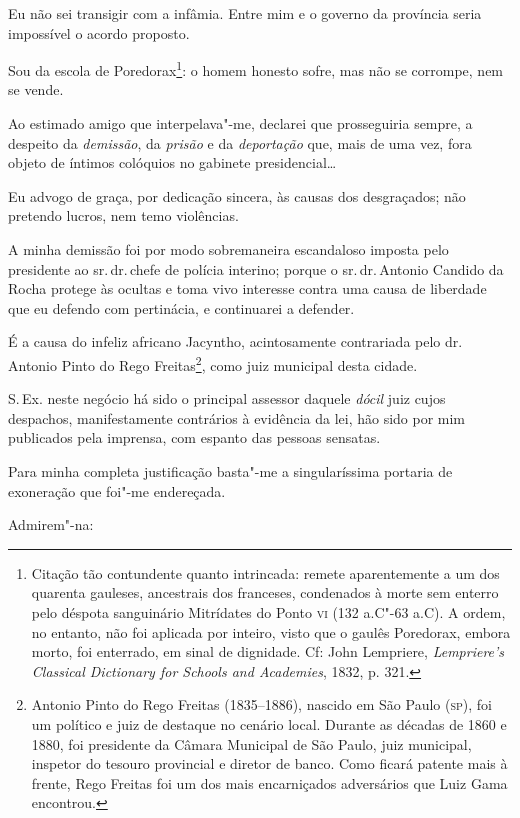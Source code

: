Eu não sei transigir com a infâmia. Entre mim e o governo da província
seria impossível o acordo proposto.

Sou da escola de Poredorax\footnote{Citação tão contundente quanto
  intrincada: remete aparentemente a um dos quarenta gauleses,
  ancestrais dos franceses, condenados à morte sem enterro pelo déspota
  sanguinário Mitrídates do Ponto \textsc{vi} (132 a.C"-63 a.C). A ordem, no
  entanto, não foi aplicada por inteiro, visto que o gaulês Poredorax,
  embora morto, foi enterrado, em sinal de dignidade. Cf: John
  Lempriere, \emph{Lempriere's Classical Dictionary for Schools and
  Academies}, 1832, p. 321.}: o homem honesto sofre, mas não se
corrompe, nem se vende.

Ao estimado amigo que interpelava"-me, declarei que prosseguiria sempre,
a despeito da \emph{demissão}, da \emph{prisão} e da \emph{deportação}
que, mais de uma vez, fora objeto de íntimos colóquios no gabinete
presidencial\ldots{}

Eu advogo de graça, por dedicação sincera, às causas dos desgraçados;
não pretendo lucros, nem temo violências.

A minha demissão foi por modo sobremaneira escandaloso imposta pelo
presidente ao sr.\,dr.\,chefe de polícia interino; porque o sr.\,dr.\,Antonio Candido da Rocha protege às ocultas e toma vivo interesse contra
uma causa de liberdade que eu defendo com pertinácia, e continuarei a
defender.

É a causa do infeliz africano Jacyntho, acintosamente contrariada pelo
dr.\,Antonio Pinto do Rego Freitas\footnote{Antonio Pinto do Rego
  Freitas (1835--1886), nascido em São Paulo (\textsc{sp}), foi um político e juiz
  de destaque no cenário local. Durante as décadas de 1860 e 1880, foi
  presidente da Câmara Municipal de São Paulo, juiz municipal, inspetor
  do tesouro provincial e diretor de banco. Como ficará patente mais à
  frente, Rego Freitas foi um dos mais encarniçados adversários que Luiz
  Gama encontrou.}, como juiz municipal desta cidade.

S.\,Ex. neste negócio há sido o principal assessor daquele \emph{dócil}
juiz cujos despachos, manifestamente contrários à evidência da lei, hão
sido por mim publicados pela imprensa, com espanto das pessoas sensatas.

Para minha completa justificação basta"-me a singularíssima portaria de
exoneração que foi"-me endereçada.

Admirem"-na:

